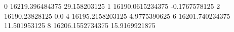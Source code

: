 0 16219.396484375 29.158203125
1 16190.0615234375 -0.1767578125
2 16190.23828125 0.0
4 16195.2158203125 4.9775390625
6 16201.740234375 11.501953125
8 16206.1552734375 15.9169921875
